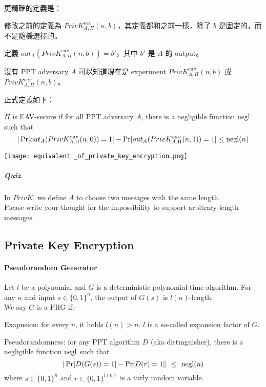 更精確的定義是：
\begin{myItemize}
	\item 修改之前的定義為 \(PrivK_{A, \Pi}^{eav}(n, b)\)，其定義都和之前一樣，除了 \(b\) 是固定的，而不是隨機選擇的。
	\item 定義 \(out_A(PrivK_{A, \Pi}^{eav}(n, b)) = b'\)，其中 \(b'\) 是 \(A\) 的 output。
	\item 沒有 PPT adversary \(A\) 可以知道現在是 experiment \(PrivK_{A, \Pi}^{eav}(n, b)\) 或 \(PrivK_{A, \Pi}^{eav}(n, b)\)。
\end{myItemize}

正式定義如下：
\begin{definition}
	\(\Pi\) is EAV-secure if for all PPT adversary \(A\), there is a negligible function \(\operatorname{negl}\) such that
	\[ | \Pr[out_A(PrivK_{A, \Pi}^{eav}(n, 0)) = 1] -
		 \Pr[out_A(PrivK_{A, \Pi}^{eav}(n,1)) = 1] \leq \operatorname{negl}(n)\]
\end{definition}

\begin{center}
	\texttt{[image: equivalent \_of\_private\_key\_encryption.png]}
\end{center}

\subparagraph{Quiz}

In \(PrivK\), we define \(A\) to choose two messages with the same length. \\
Please write your thought for the impossibility to support arbitrary-length messages.


\subsection{Private Key Encryption}


\paragraph{Pseudorandom Generator}

\begin{definition}
	Let \(l\) be a polynomial and \(G\) is a deterministic polynomial-time algorithm. For any \(n\) and input \(s \in \{0, 1\}^n\), the output of \(G(s)\) is \(l(n)\)-length. \\
	We say \(G\) is a PRG if:
	\begin{myItemize}
		\item Exapnsion: for every \(n\), it holds \(l(n) > n\). \(l\) is a so-called expansion factor of \(G\).
		\item Pseudorandomness: for any PPT algorithm \(D\) (aka distinguisher), there is a negligible function \(\operatorname{negl}\) such that
		\[ | \Pr[D(G(s)) = 1] - \Pr[D(r) = 1] | \ \leq \ \negl(n)\]
		where \(s \in \{0, 1\}^n\) and \(r \in \{0, 1\}^{l(n)}\) is a turly random variable.
	\end{myItemize}
\end{definition}



